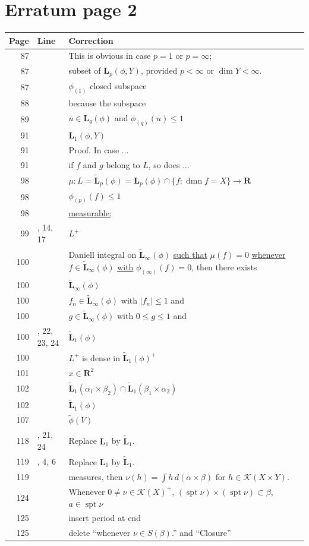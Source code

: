 \documentclass[11pt]{article}
\makeatletter
\newcommand{\R}{\mathbf R}
\newcommand{\spt}{\operatorname{spt}}
\newcommand{\dmn}{\operatorname{dmn}}
\newcommand{\Lsp}{\mathbf L}
\newcommand{\Lt}{\widetilde{\mathbf L}}
\newcommand{\entry}[3]{#1&#2&#3\\[4pt]}
\newenvironment{corrections}{%
  \begin{longtable}{@{}r >{\raggedright\arraybackslash}p{21mm} >{\raggedright\arraybackslash}p{118mm}@{}}
  \textbf{Page}&\textbf{Line}&\textbf{Correction}\\\hline\endhead
}{\end{longtable}}
\makeatother
\begin{document}
\section*{Erratum page 2}
\begin{corrections}
\entry{87}{1}{This is obvious in case $p=1$ or $p=\infty$;}
\entry{87}{18}{subset of $\Lsp_p(\phi,Y)$, provided $p<\infty$ or $\dim Y<\infty$.}
\entry{87}{32}{$\phi_{(1)}$ closed subspace}
\entry{88}{3}{because the subspace}
\entry{89}{19}{$u\in\Lsp_q(\phi)$ and $\phi_{(q)}(u)\le1$}
\entry{91}{10}{$\Lsp_1(\phi,Y)$}
\entry{91}{11}{Proof. In case $\ldots$}
\entry{91}{28}{if $f$ and $g$ belong to $L$, so does $\ldots$}
\entry{98}{10}{$\mu:L=\Lt_p(\phi)=\Lsp_p(\phi)\cap\{f:\dmn f=X\}\to\R$}
\entry{98}{11}{$\phi_{(p)}(f)\le1$}
\entry{98}{14}{\underline{measurable;}}
\entry{99}{13, 14, 17}{$L^+$}
\entry{100}{3}{Daniell integral on $\Lt_\infty(\phi)$ \underline{such that}
$\mu(f)=0$ \underline{whenever} $f\in\Lt_\infty(\phi)$ \underline{with}
$\phi_{(\infty)}(f)=0$, then there exists}
\entry{100}{5}{$\Lt_\infty(\phi)$}
\entry{100}{7}{$f_n\in\Lt_\infty(\phi)$ with $|f_n|\le1$ and}
\entry{100}{9}{$g\in\Lt_\infty(\phi)$ with $0\le g\le1$ and}
\entry{100}{21, 22, 23, 24}{$\Lt_1(\phi)$}
\entry{100}{22}{$L^+$ is dense in $\Lt_1(\phi)^+$}
\entry{101}{15}{$x\in\R^2$}
\entry{102}{8}{$\Lt_1(\alpha_1\times\beta_2)\cap\Lt_1(\beta_1\times\alpha_2)$}
\entry{102}{12}{$\Lt_1(\phi)$}
\entry{107}{24}{$\widetilde\phi(V)$}
\entry{118}{20, 21, 24}{Replace $\Lsp_1$ by $\Lt_1$.}
\entry{119}{3, 4, 6}{Replace $\Lsp_1$ by $\Lt_1$.}
\entry{119}{19}{measures, then $\nu(h)=\int h\,d(\alpha\times\beta)$ for $h\in\mathscr K(X\times Y)$.}
\entry{124}{30}{Whenever $0\ne\nu\in\mathscr K(X)^+$, $(\spt\nu)\times(\spt\nu)\subset\beta$, $a\in\spt\nu$}
\entry{125}{7}{insert period at end}
\entry{125}{8}{delete ``whenever $\nu\in S(\beta)$.'' and ``Closure''}
\end{corrections}
\end{document}
